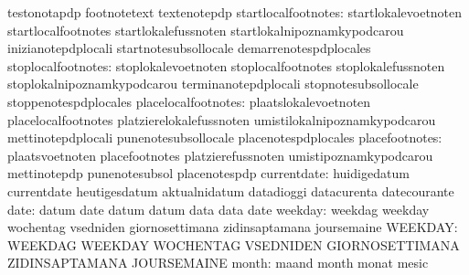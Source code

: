                                   testonotapdp                     footnotetext
                                  textenotepdp
             startlocalfootnotes: startlokalevoetnoten             startlocalfootnotes
                                  startlokalefussnoten             startlokalnipoznamkypodcarou
                                  inizianotepdplocali              startnotesubsollocale
                                  demarrenotespdplocales
              stoplocalfootnotes: stoplokalevoetnoten              stoplocalfootnotes
                                  stoplokalefussnoten              stoplokalnipoznamkypodcarou
                                  terminanotepdplocali             stopnotesubsollocale
                                  stoppenotespdplocales
             placelocalfootnotes: plaatslokalevoetnoten            placelocalfootnotes
                                  platzierelokalefussnoten         umistilokalnipoznamkypodcarou
                                  mettinotepdplocali               punenotesubsollocale
                                  placenotespdplocales
                  placefootnotes: plaatsvoetnoten                  placefootnotes
                                  platzierefussnoten               umistipoznamkypodcarou
                                  mettinotepdp                     punenotesubsol
                                  placenotespdp
                     currentdate: huidigedatum                     currentdate
                                  heutigesdatum                    aktualnidatum
                                  datadioggi                       datacurenta
                                  datecourante
                            date: datum                            date
                                  datum                            datum
                                  data                             data
                                  date
                         weekday: weekdag                          weekday
                                  wochentag                        vsedniden
                                  giornosettimana                  zidinsaptamana
                                  joursemaine
                         WEEKDAY: WEEKDAG                          WEEKDAY
                                  WOCHENTAG                        VSEDNIDEN
                                  GIORNOSETTIMANA                  ZIDINSAPTAMANA
                                  JOURSEMAINE
                           month: maand                            month
                                  monat                            mesic
